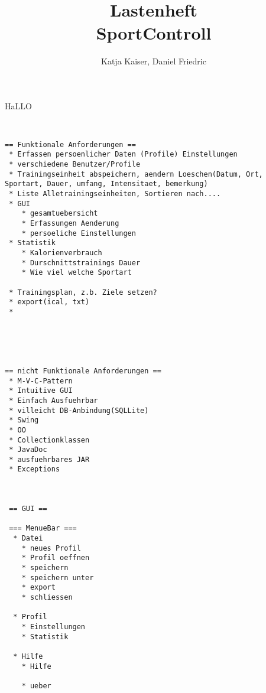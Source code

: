 \documentclass[12pt,a4paper]{article}
\author{Katja Kaiser, Daniel Friedric}
\title{Lastenheft \\ SportControll}
\begin{document}
\maketitle

HaLLO

\begin{verbatim}


== Funktionale Anforderungen ==
 * Erfassen persoenlicher Daten (Profile) Einstellungen
 * verschiedene Benutzer/Profile
 * Trainingseinheit abspeichern, aendern Loeschen(Datum, Ort, Sportart, Dauer, umfang, Intensitaet, bemerkung)
 * Liste Alletrainingseinheiten, Sortieren nach....
 * GUI 
 	* gesamtuebersicht
 	* Erfassungen Aenderung
 	* persoeliche Einstellungen
 * Statistik
 	* Kalorienverbrauch
 	* Durschnittstrainings Dauer
 	* Wie viel welche Sportart
 	 
 * Trainingsplan, z.b. Ziele setzen?
 * export(ical, txt)
 * 
 




== nicht Funktionale Anforderungen ==
 * M-V-C-Pattern
 * Intuitive GUI
 * Einfach Ausfuehrbar
 * villeicht DB-Anbindung(SQLLite)
 * Swing
 * OO
 * Collectionklassen
 * JavaDoc
 * ausfuehrbares JAR
 * Exceptions
 
 
 
 == GUI ==
 
 === MenueBar ===
  * Datei
    * neues Profil
  	* Profil oeffnen
  	* speichern
  	* speichern unter
  	* export
  	* schliessen
  	
  * Profil
  	* Einstellungen
  	* Statistik
  	
  * Hilfe
  	* Hilfe

  	* ueber
  	
  	\end{verbatim}
\end{document}
